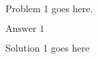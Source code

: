 \documentclass[11pt]{article}
\begin{document}
\begin{problem}
Problem 1 goes here.
\end{problem}

\begin{answer}
$\boxed{\text{Answer 1}}$
\end{answer}

\begin{solution}
Solution 1 goes here
\end{solution}
\end{document}
